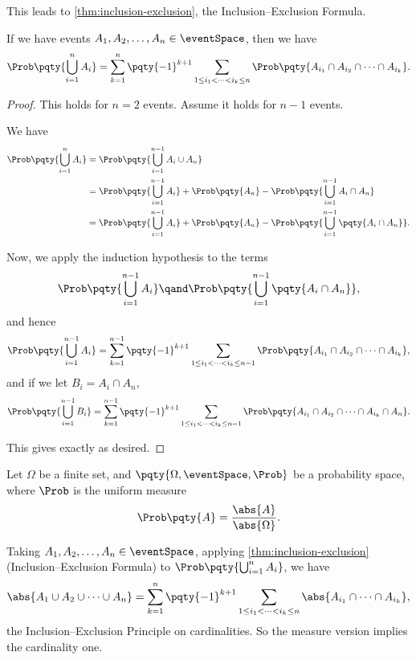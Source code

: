 This leads to \autoref{thm:inclusion-exclusion}, the Inclusion--Exclusion Formula.

\begin{theorem}
    \label{thm:inclusion-exclusion}%
    If we have events \(A_1, A_2, \ldots, A_n \in \eventSpace\), then we have
    \[
        \Prob\pqty{\bigcup_{i = 1}^{n} A_i} = \sum_{k = 1}^{n} \pqty{-1}^{k + 1} \sum_{1 \leq i_1 < \cdots < i_k \leq n} \Prob\pqty{A_{i_1} \cap A_{i_2} \cap \cdots \cap A_{i_k}}.
    \]
\end{theorem}

\begin{proof}
    This holds for \(n = 2\) events. Assume it holds for \(n - 1\) events.

    We have
    \begin{align*}
        \Prob\pqty{\bigcup_{i = 1}^{n} A_i} &= \Prob\pqty{\bigcup_{i = 1}^{n - 1} A_i \cup A_n} \\
        &= \Prob\pqty{\bigcup_{i = 1}^{n - 1} A_i} + \Prob\pqty{A_n} - \Prob\pqty{\bigcup_{i = 1}^{n - 1} A_i \cap A_n} \\
        &= \Prob\pqty{\bigcup_{i = 1}^{n - 1} A_i} + \Prob\pqty{A_n} - \Prob\pqty{\bigcup_{i = 1}^{n - 1} \pqty{A_i \cap A_n}}.
    \end{align*}

    Now, we apply the induction hypothesis to the terms
    \[
        \Prob\pqty{\bigcup_{i = 1}^{n - 1} A_i} \qand \Prob\pqty{\bigcup_{i = 1}^{n - 1} \pqty{A_i \cap A_n}},
    \]
    and hence
    \[
        \Prob\pqty{\bigcup_{i = 1}^{n - 1} A_i} = \sum_{k = 1}^{n - 1} \pqty{-1}^{k + 1} \sum_{1 \leq i_1 < \cdots < i_k \leq n - 1} \Prob\pqty{A_{i_1} \cap A_{i_2} \cap \cdots \cap A_{i_k}},
    \]
    and if we let \(B_i = A_i \cap A_n\),
    \[
        \Prob\pqty{\bigcup_{i = 1}^{n - 1} B_i} = \sum_{k = 1}^{n - 1} \pqty{-1}^{k + 1} \sum_{1 \leq i_1 < \cdots < i_k \leq n - 1} \Prob\pqty{A_{i_1} \cap A_{i_2} \cap \cdots \cap A_{i_k} \cap A_n}.
    \]

    This gives exactly as desired.
\end{proof}

\begin{remark}
    Let \(\Omega\) be a finite set, and \(\pqty{\Omega, \eventSpace, \Prob}\) be a probability space, where \(\Prob\) is the uniform measure
    \[
        \Prob\pqty{A} = \frac{\abs{A}}{\abs{\Omega}}.
    \]

    Taking \(A_1, A_2, \ldots, A_n \in \eventSpace\), applying \autoref{thm:inclusion-exclusion} (Inclusion--Exclusion Formula) to \(\Prob\pqty{\bigcup_{i = 1}^{n} A_i}\), we have
    \[
        \abs{A_1 \cup A_2 \cup \cdots \cup A_n} = \sum_{k = 1}^{n} \pqty{-1}^{k + 1} \sum_{1 \leq i_1 < \cdots < i_k \leq n} \abs{A_{i_1} \cap \cdots \cap A_{i_k}},
    \]
    the Inclusion--Exclusion Principle on cardinalities. So the measure version implies the cardinality one.
\end{remark}

